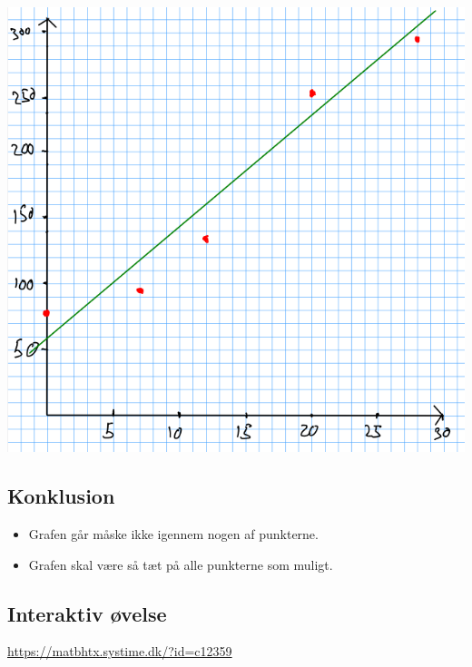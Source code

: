\documentclass[11pt]{article}
\begin{document}
\begin{center}
\includegraphics[width=.9\linewidth]{img/screenshot_2019-09-05_09-49-25.png}
\end{center}

\subsection*{Konklusion}
\label{sec:org95415f9}

\begin{itemize}
\item Grafen går måske ikke igennem nogen af punkterne.
\item Grafen skal være så tæt på alle punkterne som muligt.
\end{itemize}

\subsection*{Interaktiv øvelse}
\label{sec:orgd56344a}
\url{https://matbhtx.systime.dk/?id=c12359}
\end{document}
